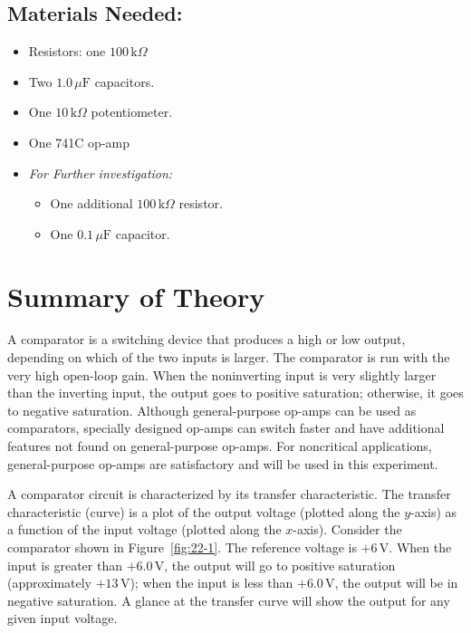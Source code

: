 \documentclass[11pt]{article}
\begin{document}
\subsection*{Materials Needed:}
\begin{itemize}
    \item Resistors: one $100\,\text{k}\Omega$
    \item Two $1.0\,\mu\text{F}$ capacitors.
    \item One $10\,\text{k}\Omega$ potentiometer.
    \item One 741C op-amp
    \item \textit{For Further investigation:}
    \begin{itemize}
        \item One additional $100\,\text{k}\Omega$ resistor.
        \item One $0.1\,\mu\text{F}$ capacitor.
    \end{itemize}
\end{itemize}

\section*{Summary of Theory}

A comparator is a switching device that produces a high or low output, depending on which of the two inputs is larger. The comparator is run with the very high open-loop gain. When the noninverting input is very slightly larger than the inverting input, the output goes to positive saturation; otherwise, it goes to negative saturation. Although general-purpose op-amps can be used as comparators, specially designed op-amps can switch faster and have additional features not found on general-purpose op-amps. For noncritical applications, general-purpose op-amps are satisfactory and will be used in this experiment.

A comparator circuit is characterized by its transfer characteristic. The transfer characteristic (curve) is a plot of the output voltage (plotted along the $y$-axis) as a function of the input voltage (plotted along the $x$-axis). Consider the comparator shown in Figure~\ref{fig:22-1}. The reference voltage is $+6\,\text{V}$. When the input is greater than $+6.0\,\text{V}$, the output will go to positive saturation (approximately $+13\,\text{V}$); when the input is less than $+6.0\,\text{V}$, the output will be in negative saturation. A glance at the transfer curve will show the output for any given input voltage.
\end{document}
